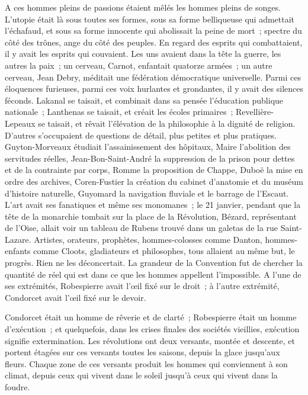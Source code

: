 \documentclass[french,twoside]{book} %
\def\mednobreak{\ifdim\lastskip<\medskipamount
  \removelastskip\nopagebreak\medskip\fi}
\newcommand{\labelblock}[1]{\medbreak{\noindent\color{rubric}\bfseries #1}\par\mednobreak}
\begin{document}
\labelblock{vi}

\noindent A ces hommes pleins de passions étaient mêlés les hommes pleins de songes. L’utopie était là sous toutes ses formes, sous sa forme belliqueuse qui admettait l’échafaud, et sous sa forme innocente qui abolissait la peine de mort ; spectre du côté des trônes, ange du côté des peuples. En regard des esprits qui combattaient, il y avait les esprits qui couvaient. Les uns avaient dans la tête la guerre, les autres la paix ; un cerveau, Carnot, enfantait quatorze armées ; un autre cerveau, Jean Debry, méditait une fédération démocratique universelle. Parmi ces éloquences furieuses, parmi ces voix hurlantes et grondantes, il y avait des silences féconds. Lakanal se taisait, et combinait dans sa pensée l’éducation publique nationale ; Lanthenas se taisait, et créait les écoles primaires ; Revellière-Lepeaux se taisait, et rêvait l’élévation de la philosophie à la dignité de religion. D’autres s’occupaient de questions de détail, plus petites et plus pratiques. Guyton-Morveaux étudiait l’assainissement des hôpitaux,  Maire l’abolition des servitudes réelles, Jean-Bon-Saint-André la suppression de la prison pour dettes et de la contrainte par corps, Romme la proposition de Chappe, Duboë la mise en ordre des archives, Coren-Fustier la création du cabinet d’anatomie et du muséum d’histoire naturelle, Guyomard la navigation fluviale et le barrage de l’Escaut. L’art avait ses fanatiques et même ses monomanes ; le 21 janvier, pendant que la tête de la monarchie tombait sur la place de la Révolution, Bézard, représentant de l’Oise, allait voir un tableau de Rubens trouvé dans un galetas de la rue Saint-Lazare. Artistes, orateurs, prophètes, hommes-colosses comme Danton, hommes-enfants comme Cloots, gladiateurs et philosophes, tous allaient au même but, le progrès. Rien ne les déconcertait. La grandeur de la Convention fut de chercher la quantité de réel qui est dans ce que les hommes appellent l’impossible. A l’une de ses extrémités, Robespierre avait l’œil fixé sur le droit ; à l’autre extrémité, Condorcet avait l’œil fixé sur le devoir.\par
Condorcet était un homme de rêverie et de clarté ; Robespierre était un homme d’exécution ; et quelquefois, dans les crises finales des sociétés vieillies, exécution signifie extermination. Les révolutions ont deux versants, montée et descente, et portent étagées sur ces versants toutes les saisons, depuis la glace jusqu’aux fleurs. Chaque zone de ces versants produit les hommes qui conviennent à son climat, depuis ceux qui vivent dans le soleil jusqu’à ceux qui vivent dans la foudre.\par
 
\end{document}
